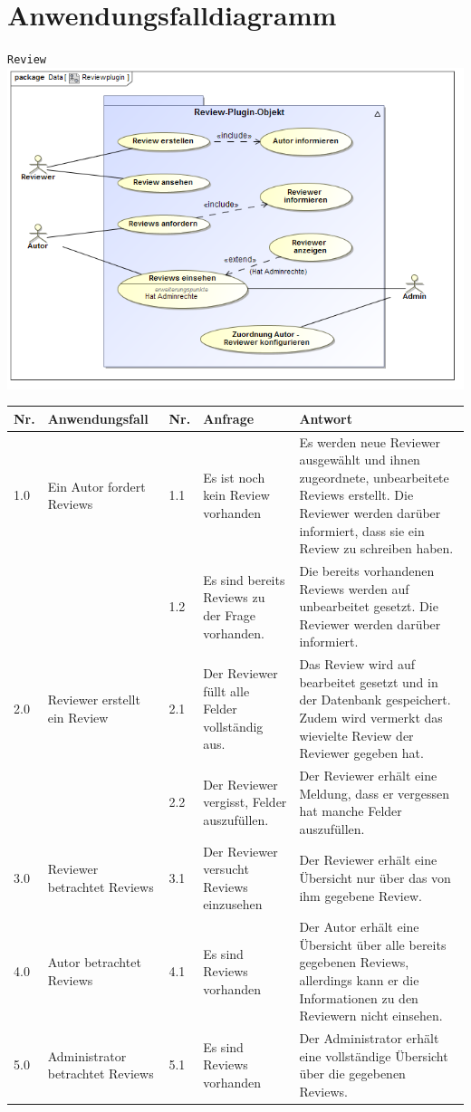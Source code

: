\documentclass[a4paper]{scrreprt}
\begin{document}
\section{Anwendungsfalldiagramm}
\texttt{Review}\\

\includegraphics[width=1.0\textwidth]{Use_Case_Diagram__Reviewplugin.png}
\label{Review}

\begin{tabular}{|p{0.5cm}|p{3cm}|p{0.5cm}|p{4cm}|p{4.5cm}|}\hline
Nr. & Anwendungsfall & Nr. & Anfrage & Antwort\\\hline
1.0 & Ein Autor fordert Reviews & 1.1 & Es ist noch kein Review vorhanden & Es werden neue Reviewer ausgewählt und ihnen zugeordnete, unbearbeitete Reviews erstellt. Die Reviewer werden darüber informiert, dass sie ein Review zu schreiben haben.\\\hline
&&1.2 & Es sind bereits Reviews zu der Frage vorhanden. & Die bereits vorhandenen Reviews werden auf unbearbeitet gesetzt. Die Reviewer werden darüber informiert.\\\hline
2.0 & Reviewer erstellt ein Review & 2.1 & Der Reviewer füllt alle Felder vollständig aus. & Das Review wird auf bearbeitet gesetzt und in der Datenbank gespeichert. Zudem wird vermerkt das wievielte Review der Reviewer gegeben hat.\\\hline
&&2.2 & Der Reviewer vergisst, Felder auszufüllen. & Der Reviewer erhält eine Meldung, dass er vergessen hat manche Felder auszufüllen. \\\hline
3.0 & Reviewer betrachtet Reviews & 3.1 & Der Reviewer versucht Reviews einzusehen & Der Reviewer erhält eine Übersicht nur über das von ihm gegebene Review. \\\hline
4.0 & Autor betrachtet Reviews & 4.1 & Es sind Reviews vorhanden & Der Autor erhält eine Übersicht über alle bereits gegebenen Reviews, allerdings kann er die Informationen zu den Reviewern nicht einsehen. \\\hline
5.0 & Administrator betrachtet Reviews & 5.1 & Es sind Reviews vorhanden & Der Administrator erhält eine vollständige Übersicht über die gegebenen Reviews. \\\hline
\end{tabular}
 
\end{document}
